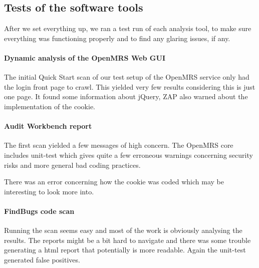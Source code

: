 \documentclass{report} %
\begin{document}
\subsection{Tests of the software tools}

  After we set everything up, we ran a test run of each analysis tool, to make sure
  everything was functioning properly and to find any glaring issues, if any.

\paragraph{Dynamic analysis of the OpenMRS Web GUI}
  
  The initial Quick Start scan of our test setup of the OpenMRS service only had
  the login front page to crawl. This yielded very few results considering this
  is just one page. It found some information about jQuery, ZAP also warned
  about the implementation of the cookie.
  
\paragraph{Audit Workbench report}  

  The first scan yielded a few messages of high concern. The OpenMRS core
  includes unit-test which gives quite a few erroneous warnings concerning
  security risks and more general bad coding practices. 

  There was an error concerning how the cookie was coded which may be
  interesting to look more into.

\paragraph{FindBugs code scan}

  Running the scan seems easy and most of the work is obviously analysing the
  results. The reports might be a bit hard to navigate and there was some
  trouble generating a html report that potentially is more readable. Again the
  unit-test generated false positives.
  
\begin{comment}
\paragraph{Dependencies}
  \begin{itemize}
    \item MySQL 1.6
    \item tomcat 7
    \item spring framework
    \item jsp
    \item java .. 1.7
  \end{itemize}
\end{comment}
\end{document}
